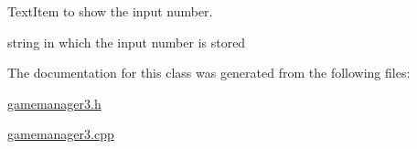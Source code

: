 \-Text\-Item to show the input number. 

string in which the input number is stored 

\-The documentation for this class was generated from the following files\-:\begin{DoxyCompactItemize}
\item 
\hyperlink{gamemanager3_8h}{gamemanager3.\-h}\item 
\hyperlink{gamemanager3_8cpp}{gamemanager3.\-cpp}\end{DoxyCompactItemize}
